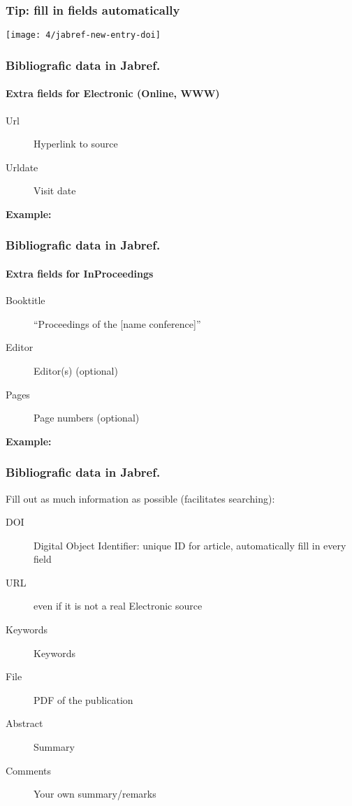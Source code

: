 \documentclass[aspectratio=169]{beamer}
\begin{document}
\begin{frame}[plain]
  \frametitle{Tip: fill in fields automatically}

  \centering
  \texttt{[image: 4/jabref-new-entry-doi]}

\end{frame}

\begin{frame}[plain]
  \frametitle{Bibliografic data in Jabref.}
  \framesubtitle{Extra fields for Electronic (Online, WWW)}

  \begin{description}
    \item[Url] Hyperlink to source
    \item[Urldate] Visit date
  \end{description}

  \bigskip

  \textbf{Example:}

  \bigskip


\end{frame}

\begin{frame}[plain]
  \frametitle{Bibliografic data in Jabref.}
  \framesubtitle{Extra fields for InProceedings}

  \begin{description}
    \item[Booktitle] ``Proceedings of the [name conference]''
    \item[Editor] Editor(s) (optional)
    \item[Pages] Page numbers (optional)
  \end{description}

  \medskip

  \textbf{Example:}

\end{frame}

\begin{frame}
  \frametitle{Bibliografic data in Jabref.}

  Fill out as much information as possible (facilitates searching):

  \begin{description}
    \item[DOI] Digital Object Identifier: unique ID for article, automatically fill in every field
    \item[URL] even if it is not a real Electronic source
    \item[Keywords] Keywords
    \item[File] PDF of the publication
    \item[Abstract] Summary
    \item[Comments] Your own summary/remarks
  \end{description}

\end{frame}
\end{document}
